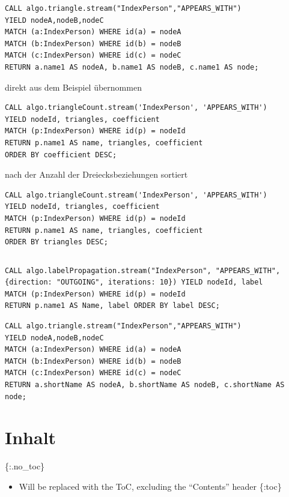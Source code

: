 \documentclass[ngerman,]{scrreprt}
\providecommand{\tightlist}{%
  \setlength{\itemsep}{0pt}\setlength{\parskip}{0pt}}
\begin{document}
\begin{verbatim}
CALL algo.triangle.stream("IndexPerson","APPEARS_WITH")
YIELD nodeA,nodeB,nodeC
MATCH (a:IndexPerson) WHERE id(a) = nodeA
MATCH (b:IndexPerson) WHERE id(b) = nodeB
MATCH (c:IndexPerson) WHERE id(c) = nodeC
RETURN a.name1 AS nodeA, b.name1 AS nodeB, c.name1 AS node;
\end{verbatim}

direkt aus dem Beispiel übernommen

\begin{verbatim}
CALL algo.triangleCount.stream('IndexPerson', 'APPEARS_WITH')
YIELD nodeId, triangles, coefficient
MATCH (p:IndexPerson) WHERE id(p) = nodeId
RETURN p.name1 AS name, triangles, coefficient
ORDER BY coefficient DESC;
\end{verbatim}

nach der Anzahl der Dreiecksbeziehungen sortiert

\begin{verbatim}
CALL algo.triangleCount.stream('IndexPerson', 'APPEARS_WITH')
YIELD nodeId, triangles, coefficient
MATCH (p:IndexPerson) WHERE id(p) = nodeId
RETURN p.name1 AS name, triangles, coefficient
ORDER BY triangles DESC;
\end{verbatim}

\begin{verbatim}
\end{verbatim}

\begin{verbatim}
CALL algo.labelPropagation.stream("IndexPerson", "APPEARS_WITH", {direction: "OUTGOING", iterations: 10}) YIELD nodeId, label
MATCH (p:IndexPerson) WHERE id(p) = nodeId
RETURN p.name1 AS Name, label ORDER BY label DESC;
\end{verbatim}

\begin{verbatim}
CALL algo.triangle.stream("IndexPerson","APPEARS_WITH")
YIELD nodeA,nodeB,nodeC
MATCH (a:IndexPerson) WHERE id(a) = nodeA
MATCH (b:IndexPerson) WHERE id(b) = nodeB
MATCH (c:IndexPerson) WHERE id(c) = nodeC
RETURN a.shortName AS nodeA, b.shortName AS nodeB, c.shortName AS node;
\end{verbatim}

\chapter{Inhalt}\label{inhalt-7}

\{:.no\_toc\}

\begin{itemize}
\tightlist
\item
  Will be replaced with the ToC, excluding the ``Contents'' header \{:toc\}
\end{itemize}
\end{document}
